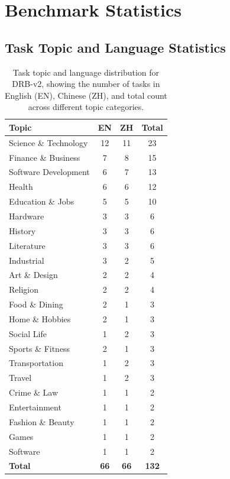 \documentclass[11pt]{article}
\begin{document}
\clearpage

\onecolumn
\appendix

\section{Benchmark Statistics}
\subsection{Task Topic and Language Statistics}

\begin{table}[h]
\centering
\begin{tabular}{lccc}
\toprule
\textbf{Topic} & \textbf{EN} & \textbf{ZH} & \textbf{Total} \\
\midrule
Science \& Technology & 12 & 11 & 23 \\
Finance \& Business & 7 & 8 & 15 \\
Software Development & 6 & 7 & 13 \\
Health & 6 & 6 & 12 \\
Education \& Jobs & 5 & 5 & 10 \\
Hardware & 3 & 3 & 6 \\
History & 3 & 3 & 6 \\
Literature & 3 & 3 & 6 \\
Industrial & 3 & 2 & 5 \\
Art \& Design & 2 & 2 & 4 \\
Religion & 2 & 2 & 4 \\
Food \& Dining & 2 & 1 & 3 \\
Home \& Hobbies & 2 & 1 & 3 \\
Social Life & 1 & 2 & 3 \\
Sports \& Fitness & 2 & 1 & 3 \\
Transportation & 1 & 2 & 3 \\
Travel & 1 & 2 & 3 \\
Crime \& Law & 1 & 1 & 2 \\
Entertainment & 1 & 1 & 2 \\
Fashion \& Beauty & 1 & 1 & 2 \\
Games & 1 & 1 & 2 \\
Software & 1 & 1 & 2 \\
\midrule
\textbf{Total} & \textbf{66} & \textbf{66} & \textbf{132} \\
\bottomrule
\end{tabular}
\caption{Task topic and language distribution for DRB-v2, showing the number of tasks in English (EN), Chinese (ZH), and total count across different topic categories.}
\label{tab:task-topic-language-distribution}
\end{table}
\end{document}
